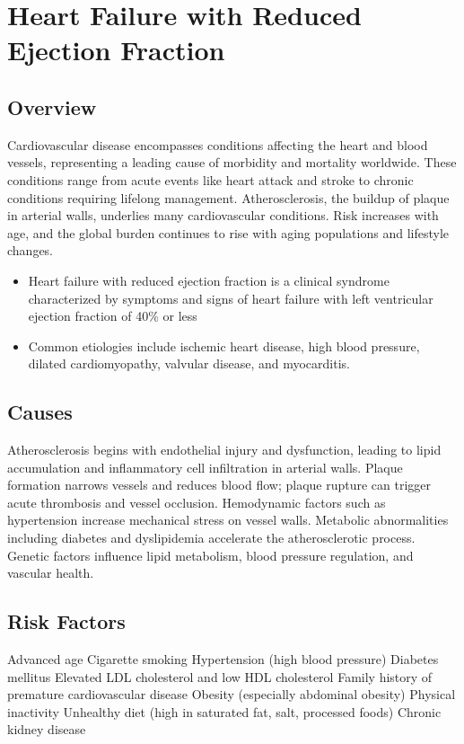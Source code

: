 \chapter{Heart Failure with Reduced Ejection Fraction}
\label{sec:Heart Failure with Reduced Ejection Fraction}

\section{Overview}
Cardiovascular disease encompasses conditions affecting the heart and blood vessels, representing a leading cause of morbidity and mortality worldwide. These conditions range from acute events like heart attack and stroke to chronic conditions requiring lifelong management. Atherosclerosis, the buildup of plaque in arterial walls, underlies many cardiovascular conditions. Risk increases with age, and the global burden continues to rise with aging populations and lifestyle changes.

\begin{itemize}[noitemsep]
  \item Heart failure with reduced ejection fraction is a clinical syndrome characterized by symptoms and signs of heart failure with left ventricular ejection fraction of 40\% or less
  \item Common etiologies include ischemic heart disease, high blood pressure, dilated cardiomyopathy, valvular disease, and myocarditis.
\end{itemize}
\section{Causes}
Atherosclerosis begins with endothelial injury and dysfunction, leading to lipid accumulation and inflammatory cell infiltration in arterial walls. Plaque formation narrows vessels and reduces blood flow; plaque rupture can trigger acute thrombosis and vessel occlusion. Hemodynamic factors such as hypertension increase mechanical stress on vessel walls. Metabolic abnormalities including diabetes and dyslipidemia accelerate the atherosclerotic process. Genetic factors influence lipid metabolism, blood pressure regulation, and vascular health.
\section{Risk Factors}
Advanced age Cigarette smoking Hypertension (high blood pressure) Diabetes mellitus Elevated LDL cholesterol and low HDL cholesterol Family history of premature cardiovascular disease Obesity (especially abdominal obesity) Physical inactivity Unhealthy diet (high in saturated fat, salt, processed foods) Chronic kidney disease

